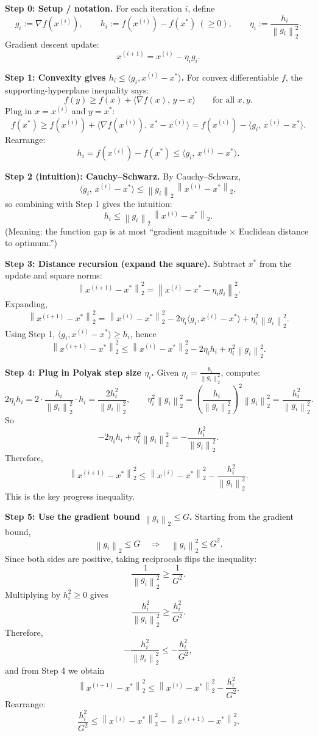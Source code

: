 \documentclass[10pt]{article}
\newcommand{\norm}[1]{\left\lVert #1\right\rVert}
\begin{document}


\textbf{Step 0: Setup / notation.}
For each iteration $i$, define
\[
g_i := \nabla f(x^{(i)}),
\qquad
h_i := f(x^{(i)}) - f(x^*) \ (\ge 0),
\qquad
\eta_i := \frac{h_i}{\norm{g_i}_2^2}.
\]
Gradient descent update:
\[
x^{(i+1)} = x^{(i)} - \eta_i g_i.
\]

\medskip
\textbf{Step 1: Convexity gives $h_i \le \langle g_i, x^{(i)}-x^*\rangle$.}
For convex differentiable $f$, the supporting-hyperplane inequality says:
\[
f(y) \ge f(x) + \langle \nabla f(x),\, y-x\rangle
\qquad \text{for all }x,y.
\]
Plug in $x=x^{(i)}$ and $y=x^*$:
\[
f(x^*) \ge f(x^{(i)}) + \langle \nabla f(x^{(i)}),\, x^* - x^{(i)}\rangle
= f(x^{(i)}) - \langle g_i,\, x^{(i)}-x^*\rangle.
\]
Rearrange:
\[
\boxed{
h_i = f(x^{(i)})-f(x^*) \le \langle g_i,\, x^{(i)}-x^*\rangle.
}
\]

\medskip
\textbf{Step 2 (intuition): Cauchy--Schwarz.}
By Cauchy--Schwarz,
\[
\langle g_i,\, x^{(i)}-x^*\rangle \le \norm{g_i}_2\,\norm{x^{(i)}-x^*}_2,
\]
so combining with Step 1 gives the intuition:
\[
\boxed{
h_i \le \norm{g_i}_2\,\norm{x^{(i)}-x^*}_2.
}
\]
(Meaning: the function gap is at most ``gradient magnitude $\times$ Euclidean distance to optimum.'')

\medskip
\textbf{Step 3: Distance recursion (expand the square).}
Subtract $x^*$ from the update and square norms:
\[
\norm{x^{(i+1)}-x^*}_2^2
=
\norm{x^{(i)}-x^*-\eta_i g_i}_2^2.
\]
Expanding,
\[
\norm{x^{(i+1)}-x^*}_2^2
=
\norm{x^{(i)}-x^*}_2^2
-2\eta_i\langle g_i, x^{(i)}-x^*\rangle
+\eta_i^2\norm{g_i}_2^2.
\]
Using Step 1, $\langle g_i, x^{(i)}-x^*\rangle \ge h_i$, hence
\[
\norm{x^{(i+1)}-x^*}_2^2
\le
\norm{x^{(i)}-x^*}_2^2
-2\eta_i h_i
+\eta_i^2\norm{g_i}_2^2.
\]

\medskip
\textbf{Step 4: Plug in Polyak step size $\eta_i$.}
Given $\eta_i=\frac{h_i}{\norm{g_i}_2^2}$, compute:
\[
2\eta_i h_i
=
2\cdot \frac{h_i}{\norm{g_i}_2^2}\cdot h_i
=
\frac{2h_i^2}{\norm{g_i}_2^2},
\qquad
\eta_i^2\norm{g_i}_2^2
=
\left(\frac{h_i}{\norm{g_i}_2^2}\right)^2\norm{g_i}_2^2
=
\frac{h_i^2}{\norm{g_i}_2^2}.
\]
So
\[
-2\eta_i h_i + \eta_i^2\norm{g_i}_2^2
=
-\frac{h_i^2}{\norm{g_i}_2^2}.
\]
Therefore,
\[
\boxed{
\norm{x^{(i+1)}-x^*}_2^2
\le
\norm{x^{(i)}-x^*}_2^2
-\frac{h_i^2}{\norm{g_i}_2^2}.
}
\]
This is the key progress inequality.

\medskip
\textbf{Step 5: Use the gradient bound $\norm{g_i}_2\le G$.}
Starting from the gradient bound,
\[
\norm{g_i}_2\le G
\quad\Longrightarrow\quad
\norm{g_i}_2^2\le G^2.
\]
Since both sides are positive, taking reciprocals flips the inequality:
\[
\frac{1}{\norm{g_i}_2^2} \ge \frac{1}{G^2}.
\]
Multiplying by $h_i^2\ge 0$ gives
\[
\frac{h_i^2}{\norm{g_i}_2^2} \ge \frac{h_i^2}{G^2}.
\]
Therefore,
\[
-\frac{h_i^2}{\norm{g_i}_2^2} \le -\frac{h_i^2}{G^2},
\]
and from Step 4 we obtain
\[
\boxed{
\norm{x^{(i+1)}-x^*}_2^2
\le
\norm{x^{(i)}-x^*}_2^2
-\frac{h_i^2}{G^2}.
}
\]
Rearrange:
\[
\frac{h_i^2}{G^2}
\le
\norm{x^{(i)}-x^*}_2^2 - \norm{x^{(i+1)}-x^*}_2^2.
\]
\end{document}
